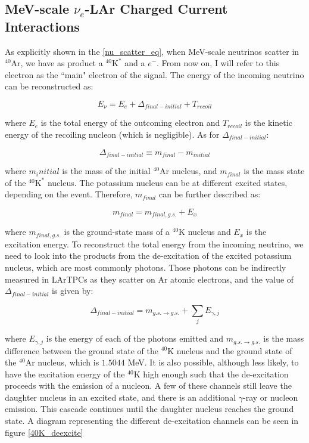 \subsection{MeV-scale $\nu_e$-LAr Charged Current Interactions}

As explicitly shown in the \ref{nu_scatter_eq}, when MeV-scale neutrinos scatter in $^{40}$Ar, we have as product a $^{40}\textrm{K}^{*}$ and a $e^{-}$. From now on, I will refer to this electron as the ``main" electron of the signal. The energy of the incoming neutrino can be reconstructed as:

\begin{equation}
    E_{\nu} = E_e + \Delta_{final-initial} + T_{recoil} 
    \label{E_mudar_nu}
\end{equation}

where $E_e$ is the total energy of the outcoming electron and $T_{recoil}$ is the kinetic energy of the recoiling nucleon (which is negligible). As for $\Delta_{final-initial}$: 

 \begin{equation}
    \Delta_{final-initial} \equiv m_{final} - m_{initial}  
    \label{delta_fi}
\end{equation}

where $m_initial$ is the mass of the initial $^{40}$Ar nucleus, and $m_{final}$ is the mass state of the $^{40}\textrm{K}^{*}$ nucleus. The potassium nucleus can be at different excited states, depending on the event. Therefore, $m_{final}$ can be further described as:

\begin{equation}
    m_{final} = m_{final, g.s.} + E_x
    \label{mfinal}
\end{equation}

where $m_{final, g.s.}$ is the ground-state mass of a $^40$K nucleus and $E_x$ is the excitation energy. To reconstruct the total energy from the incoming neutrino, we need to look into the products from the de-excitation of the excited potassium nucleus, which are most commonly photons. Those photons can be indirectly measured in LArTPCs as they scatter on Ar atomic electrons, and the value of $\Delta_{final-initial}$ is given by:

\begin{equation}
    \Delta_{final-initial} = m_{g.s. \rightarrow g.s.} + \sum_{j}E_{\gamma, j}   
    \label{delta_fi_2}
\end{equation}

where $E_{\gamma,j}$ is the energy of each of the photons emitted and $m_{g.s. \rightarrow g.s.}$ is the mass difference between the ground state of the $^{40}$K nucleus and the ground state of the $^{40}$Ar nucleus, which is $1.5044$ MeV. 
It is also possible, although less likely, to have the excitation energy of the $^{40}$K high enough such that the de-excitation proceeds with the emission of a nucleon. A few of these channels still leave the daughter nucleus in an excited state, and there is an additional $\gamma$-ray or nucleon emission. This cascade continues until the daughter nucleus reaches the ground state. A diagram representing the different de-excitation channels can be seen in figure \ref{40K_deexcite}

